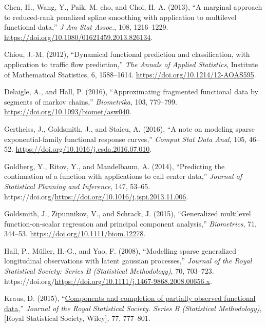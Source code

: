 \documentclass[
  11pt,
]{article}
\newlength{\cslhangindent}
\newlength{\cslentryspacingunit} %
\newenvironment{CSLReferences}[2] %
 {%
  \setlength{\parindent}{0pt}
  \ifodd #1
  \let\oldpar\par
  \def\par{\hangindent=\cslhangindent\oldpar}
  \fi
  \setlength{\parskip}{#2\cslentryspacingunit}
 }%
 {}
\begin{document}
\hypertarget{refs}{}
\begin{CSLReferences}{1}{0}
\leavevmode{}%
Chen, H., Wang, Y., Paik, M. cho, and Choi, H. A. (2013), {``A marginal
approach to reduced-rank penalized spline smoothing with application to
multilevel functional data,''} \emph{J Am Stat Assoc.}, 108, 1216--1229.
\url{https://doi.org/10.1080/01621459.2013.826134}.

\leavevmode{}%
Chiou, J.-M. (2012), {``Dynamical functional prediction and
classification, with application to traffic flow prediction,''}
\emph{The Annals of Applied Statistics}, Institute of Mathematical
Statistics, 6, 1588--1614. \url{https://doi.org/10.1214/12-AOAS595}.

\leavevmode{}%
Delaigle, A., and Hall, P. (2016), {``Approximating fragmented
functional data by segments of markov chains,''} \emph{Biometrika}, 103,
779--799. \url{https://doi.org/10.1093/biomet/asw040}.

\leavevmode{}%
Gertheiss, J., Goldsmith, J., and Staicu, A. (2016), {``A note on
modeling sparse exponential-family functional response curves,''}
\emph{Comput Stat Data Anal}, 105, 46--52.
\url{https://doi.org/10.1016/j.csda.2016.07.010}.

\leavevmode{}%
Goldberg, Y., Ritov, Y., and Mandelbaum, A. (2014), {``Predicting the
continuation of a function with applications to call center data,''}
\emph{Journal of Statistical Planning and Inference}, 147, 53--65.
https://doi.org/\url{https://doi.org/10.1016/j.jspi.2013.11.006}.

\leavevmode{}%
Goldsmith, J., Zipunnikov, V., and Schrack, J. (2015), {``Generalized
multilevel function-on-scalar regression and principal component
analysis,''} \emph{Biometrics}, 71, 344--53.
\url{https://doi.org/10.1111/biom.12278}.

\leavevmode{}%
Hall, P., Müller, H.-G., and Yao, F. (2008), {``Modelling sparse
generalized longitudinal observations with latent gaussian processes,''}
\emph{Journal of the Royal Statistical Society: Series B (Statistical
Methodology)}, 70, 703--723.
https://doi.org/\url{https://doi.org/10.1111/j.1467-9868.2008.00656.x}.

\leavevmode{}%
Kraus, D. (2015),
{``\href{http://www.jstor.org/stable/24775309}{Components and completion
of partially observed functional data},''} \emph{Journal of the Royal
Statistical Society. Series B (Statistical Methodology)}, {[}Royal
Statistical Society, Wiley{]}, 77, 777--801.


\end{CSLReferences}
\end{document}
